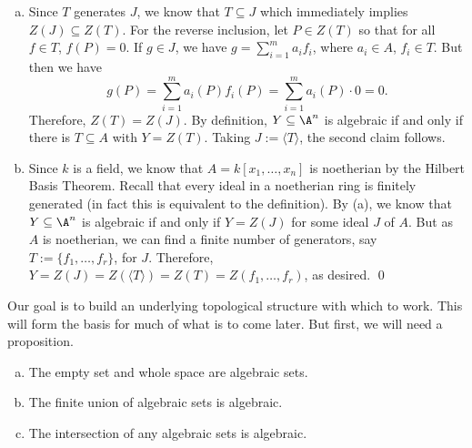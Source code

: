 \pf \hfill
\begin{enumerate}[(a)]
\item Since $T$ generates $J$, we know that $T \subseteq J$ which immediately implies $Z(J) \subseteq Z(T)$. For the reverse inclusion, let $P \in Z(T)$ so that for all $f \in T$, $f(P)=0$. If $g \in J$, we have $g= \sum_{i=1}^m a_i f_i$, where $a_i \in A$, $f_i \in T$. But then we have
	\[
	g(P)= \sum_{i=1}^m a_i(P) f_i(P)= \sum_{i=1}^m a_i(P) \cdot 0= 0.
	\]
Therefore, $Z(T)= Z(J)$. By definition, $Y \subseteq \A^n$ is algebraic if and only if there is $T \subseteq A$ with $Y= Z(T)$. Taking $J:= \langle T \rangle$, the second claim follows. 


\item Since $k$ is a field, we know that $A= k[x_1,\ldots,x_n]$ is noetherian by the Hilbert Basis Theorem. Recall that every ideal in a noetherian ring is finitely generated (in fact this is equivalent to the definition).  By (a), we know that $Y \subseteq \A^n$ is algebraic if and only if $Y= Z(J)$ for some ideal $J$ of $A$. But as $A$ is noetherian, we can find a finite number of generators, say $T:=\{f_1,\ldots, f_r\}$, for $J$. Therefore, $Y= Z(J)=Z(\langle T \rangle)=Z(T)= Z(f_1,\ldots,f_r)$, as desired. \qed \\
\end{enumerate}


Our goal is to build an underlying topological structure with which to work. This will form the basis for much of what is to come later. But first, we will need a proposition. 


\begin{prop} \label{prop:closedset} \hfill
\begin{enumerate}[(a)]
\item The empty set and whole space are algebraic sets. 
\item The finite union of algebraic sets is algebraic.
\item The intersection of any algebraic sets is algebraic. 
\end{enumerate}
\end{prop}

